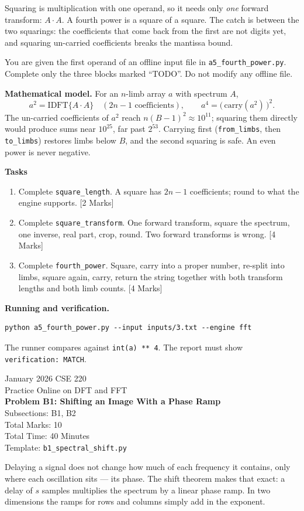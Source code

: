 \documentclass[11pt]{article}
\newcommand{\file}[1]{\texttt{#1}}
\newcommand{\code}[1]{\texttt{#1}}
\newcommand{\problemheader}[3]{%
  \begin{center}
    {\large January 2026 CSE 220}\\
    {\large Practice Online on DFT and FFT}\\[2pt]
    {\Large\bfseries #1}\\[2pt]
    Subsections: #2\\
    Total Marks: 10\\
    Total Time: 40 Minutes\\[2pt]
    {\small Template: \file{#3}}
  \end{center}
  \vspace{4pt}
}
\begin{document}
Squaring is multiplication with one operand, so it needs only \emph{one}
forward transform: $A \cdot A$. A fourth power is a square of a square. The
catch is between the two squarings: the coefficients that come back from the
first are not digits yet, and squaring un-carried coefficients breaks the
mantissa bound.

You are given the first operand of an offline input file in
\file{a5\_fourth\_power.py}. Complete only the three blocks marked ``TODO''. Do
not modify any offline file.

\textbf{Mathematical model.} For an $n$-limb array $a$ with spectrum $A$,
\[
  a^2 = \mathrm{IDFT}\{A \cdot A\} \quad (2n - 1 \text{ coefficients}),
  \qquad a^4 = \big(\,\mathrm{carry}(a^2)\,\big)^2 .
\]
The un-carried coefficients of $a^2$ reach $n(B-1)^2 \approx 10^{11}$; squaring
them directly would produce sums near $10^{25}$, far past $2^{53}$. Carrying
first (\code{from\_limbs}, then \code{to\_limbs}) restores limbs below $B$, and
the second squaring is safe. An even power is never negative.

\textbf{Tasks}
\begin{enumerate}[nosep]
  \item Complete \code{square\_length}. A square has $2n - 1$ coefficients;
        round to what the engine supports.
        \hfill [2 Marks]
  \item Complete \code{square\_transform}. One forward transform, square the
        spectrum, one inverse, real part, crop, round. Two forward transforms
        is wrong.
        \hfill [4 Marks]
  \item Complete \code{fourth\_power}. Square, carry into a proper number,
        re-split into limbs, square again, carry, return the string together
        with both transform lengths and both limb counts.
        \hfill [4 Marks]
\end{enumerate}

\textbf{Running and verification.}
\begin{lstlisting}
python a5_fourth_power.py --input inputs/3.txt --engine fft
\end{lstlisting}
The runner compares against \code{int(a) ** 4}. The report must show
\code{verification: MATCH}.

\newpage
\problemheader{Problem B1: Shifting an Image With a Phase Ramp}{B1, B2}{b1\_spectral\_shift.py}

Delaying a signal does not change how much of each frequency it contains, only
where each oscillation sits --- its phase. The shift theorem makes that exact:
a delay of $s$ samples multiplies the spectrum by a linear phase ramp. In two
dimensions the ramps for rows and columns simply add in the exponent.
\end{document}
